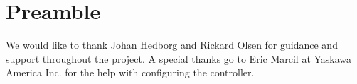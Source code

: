 
\section*{Preamble}

We would like to thank Johan Hedborg and Rickard Olsen for guidance and support throughout the project. A special thanks go to Eric Marcil at Yaskawa America Inc. for the help with configuring the controller.